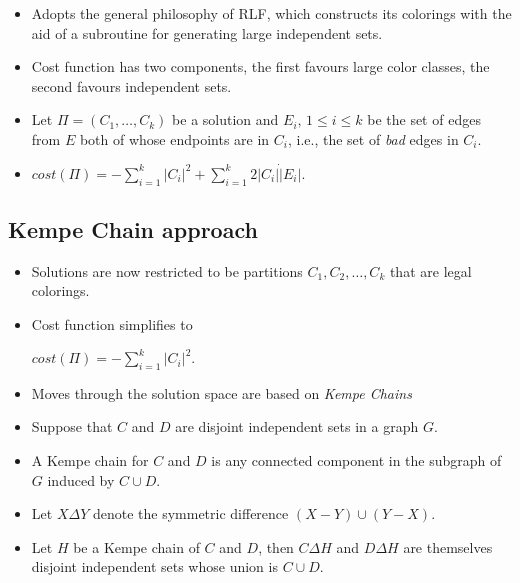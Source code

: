 \begin{itemize}
	\item Adopts the general philosophy of RLF, which constructs its colorings with the aid of a subroutine for generating large independent sets.
	\item Cost function has two components, the first favours large color classes, the second favours independent sets.
	\item Let $\Pi = (C_1,\ldots,C_k)$ be a solution and $E_i, \, 1 \leq i \leq k$ be the set of edges from $E$ both of whose endpoints are in $C_i$, i.e., the set of \emph{bad} edges in $C_i$.
	\item 
		\begin{theorem}
		\centering
		$cost(\Pi) = - \displaystyle \sum_{i=1}^{k} |C_i|^2 + \sum_{i=1}^{k} 2|C_i| \dot |E_i|$.
		\end{theorem}
	\end{itemize}

\subsection{Kempe Chain approach}

\begin{itemize}
\item Solutions are now restricted to be partitions $C_1,C_2,\ldots,C_k$ that are legal colorings.
\item Cost function simplifies to
\begin{theorem}
$cost(\Pi) = - \displaystyle \sum_{i=1}^{k} |C_i|^2.$
\end{theorem}
\item Moves through the solution space are based on \emph{Kempe Chains}
\end{itemize}

\begin{itemize}
	\item Suppose that $C$ and $D$ are disjoint independent sets in a graph $G$.
	\item A Kempe chain for $C$ and $D$ is any connected component in the subgraph of $G$ induced by $C \cup D$.
	\item Let $X \Delta Y$ denote the symmetric difference $(X-Y)\cup(Y-X)$.
	\item Let $H$ be a Kempe chain of $C$ and $D$, then $C \Delta H$ and $D \Delta H$ are themselves disjoint independent sets whose union is $C \cup D$.
\end{itemize}

